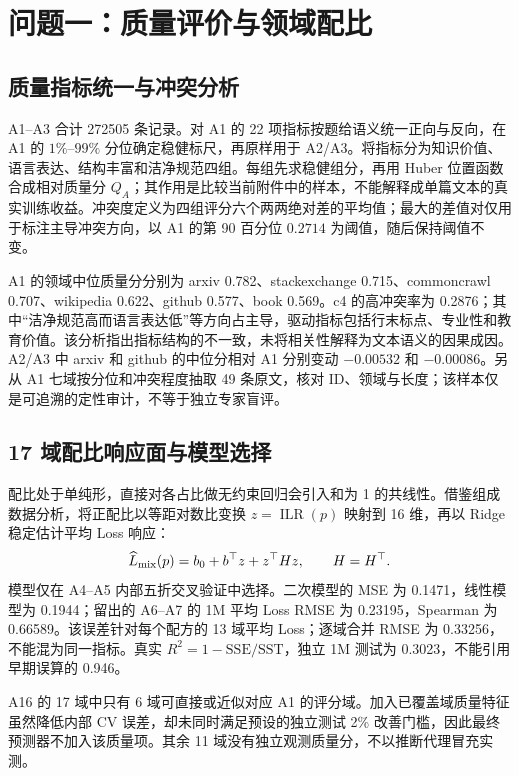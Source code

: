 \section{问题一：质量评价与领域配比}
\subsection{质量指标统一与冲突分析}
A1--A3 合计 272505 条记录。对 A1 的 22 项指标按题给语义统一正向与反向，在 A1 的 $1\%$--$99\%$ 分位确定稳健标尺，再原样用于 A2/A3。将指标分为知识价值、语言表达、结构丰富和洁净规范四组。每组先求稳健组分，再用 Huber 位置函数合成相对质量分 $Q_A$；其作用是比较当前附件中的样本，不能解释成单篇文本的真实训练收益。冲突度定义为四组评分六个两两绝对差的平均值；最大的差值对仅用于标注主导冲突方向，以 A1 的第 90 百分位 $0.2714$ 为阈值，随后保持阈值不变。

A1 的领域中位质量分分别为 arxiv 0.782、stackexchange 0.715、commoncrawl 0.707、wikipedia 0.622、github 0.577、book 0.569。c4 的高冲突率为 0.2876；其中“洁净规范高而语言表达低”等方向占主导，驱动指标包括行末标点、专业性和教育价值。该分析指出指标结构的不一致，未将相关性解释为文本语义的因果成因。A2/A3 中 arxiv 和 github 的中位分相对 A1 分别变动 $-0.00532$ 和 $-0.00086$。另从 A1 七域按分位和冲突程度抽取 49 条原文，核对 ID、领域与长度；该样本仅是可追溯的定性审计，不等于独立专家盲评。

\subsection{17 域配比响应面与模型选择}
配比处于单纯形，直接对各占比做无约束回归会引入和为 1 的共线性。借鉴组成数据分析\cite{aitchison}，将正配比以等距对数比变换 $z=\operatorname{ILR}(p)$ 映射到 16 维，再以 Ridge 稳定估计平均 Loss 响应：
\begin{equation}
\widehat L_{\rm mix}(p)=b_0+b^\top z+z^\top H z,\qquad H=H^\top .
\end{equation}
模型仅在 A4--A5 内部五折交叉验证中选择。二次模型的 MSE 为 0.1471，线性模型为 0.1944；留出的 A6--A7 的 1M 平均 Loss RMSE 为 0.23195，Spearman 为 0.66589。该误差针对每个配方的 13 域平均 Loss；逐域合并 RMSE 为 0.33256，不能混为同一指标。真实 $R^2=1-\mathrm{SSE}/\mathrm{SST}$，独立 1M 测试为 0.3023，不能引用早期误算的 0.946。

A16 的 17 域中只有 6 域可直接或近似对应 A1 的评分域。加入已覆盖域质量特征虽然降低内部 CV 误差，却未同时满足预设的独立测试 2\% 改善门槛，因此最终预测器不加入该质量项。其余 11 域没有独立观测质量分，不以推断代理冒充实测。

